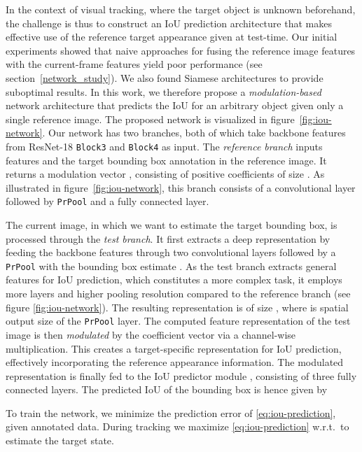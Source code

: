 \documentclass[10pt,twocolumn,letterpaper]{article}
\begin{document}
In the context of visual tracking, where the target object is unknown beforehand, the challenge is thus to construct an IoU prediction architecture that makes effective use of the reference target appearance given at test-time. Our initial experiments showed that naive approaches for fusing the reference image features with the current-frame features yield poor performance (see section~\ref{network_study}). We also found Siamese architectures to provide suboptimal results. In this work, we therefore propose a \emph{modulation-based} network architecture that predicts the IoU for an arbitrary object given only a single reference image. The proposed network is visualized in figure~\ref{fig:iou-network}. Our network has two branches, both of which take backbone features from ResNet-18 \verb|Block3| and \verb|Block4| as input. The \emph{reference branch} inputs features  and the target bounding box annotation  in the reference image. It returns a modulation vector , consisting of positive coefficients of size . As illustrated in figure~\ref{fig:iou-network}, this branch consists of a convolutional layer followed by \verb|PrPool| and a fully connected layer. 

The current image, in which we want to estimate the target bounding box, is processed through the \emph{test branch}. It first extracts a deep representation by feeding the backbone features  through two convolutional layers followed by a \verb|PrPool| with the bounding box estimate . As the test branch extracts general features for IoU prediction, which constitutes a more complex task, it employs more layers and higher pooling resolution compared to the reference branch (see figure \ref{fig:iou-network}). The resulting representation  is of size , where  is spatial output size of the \verb|PrPool| layer. The computed feature representation of the test image is then \emph{modulated} by the coefficient vector  via a channel-wise multiplication. This creates a target-specific representation for IoU prediction, effectively incorporating the reference appearance information. The modulated representation is finally fed to the IoU predictor module , consisting of three fully connected layers. The predicted IoU of the bounding box  is hence given by

To train the network, we minimize the prediction error of \eqref{eq:iou-prediction}, given annotated data. During tracking we maximize \eqref{eq:iou-prediction} w.r.t.\  to estimate the target state.
\end{document}
